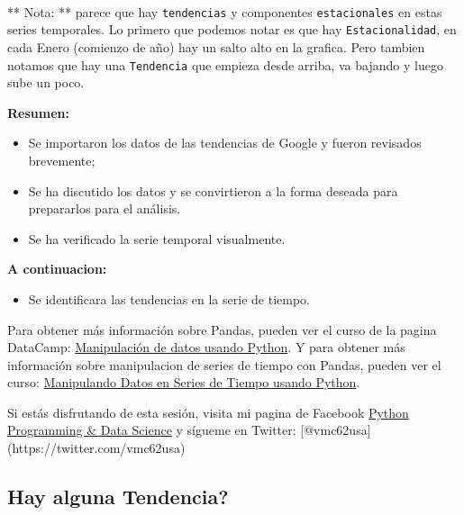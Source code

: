 \documentclass[11pt]{article}
\providecommand{\tightlist}{%
      \setlength{\itemsep}{0pt}\setlength{\parskip}{0pt}}
\begin{document}
    \begin{center}
    \end{center}
    { \hspace*{\fill} \\}
    
    ** Nota: ** parece que hay \texttt{tendencias} y componentes
\texttt{estacionales} en estas series temporales. Lo primero que podemos
notar es que hay \texttt{Estacionalidad}, en cada Enero (comienzo de
año) hay un salto alto en la grafica. Pero tambien notamos que hay una
\texttt{Tendencia} que empieza desde arriba, va bajando y luego sube un
poco.

    \textbf{Resumen:}

\begin{itemize}
\tightlist
\item
  Se importaron los datos de las tendencias de Google y fueron revisados
  brevemente;
\item
  Se ha discutido los datos y se convirtieron a la forma deseada para
  prepararlos para el análisis.
\item
  Se ha verificado la serie temporal visualmente.
\end{itemize}

\textbf{A continuacion:}

\begin{itemize}
\tightlist
\item
  Se identificara las tendencias en la serie de tiempo.
\end{itemize}

    Para obtener más información sobre Pandas, pueden ver el curso de la
pagina DataCamp:
\href{https://www.datacamp.com/tracks/data-manipulation-with-python}{Manipulación
de datos usando Python}. Y para obtener más información sobre
manipulacion de series de tiempo con Pandas, pueden ver el curso:
\href{https://www.datacamp.com/courses/manipulating-time-series-data-in-python}{Manipulando
Datos en Series de Tiempo usando Python}.

Si estás disfrutando de esta sesión, visita mi pagina de Facebook
\href{https://www.facebook.com/pythonfordatascience}{Python Programming
\& Data Science} y sígueme en Twitter:
{[}@vmc62usa{]}(https://twitter.com/vmc62usa)

    \subsection{Hay alguna Tendencia?}\label{hay-alguna-tendencia}
\end{document}
